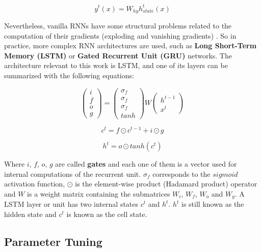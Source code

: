 \begin{equation}
    y^{t}(x) = W_{hy}h_{state}^{t}(x)
\end{equation}

Nevertheless, vanilla RNNs have some structural problems related to the computation of their gradients (exploding and vanishing gradients) \cite{bengio1994learning, pascanu2013difficulty}. So in practice, more complex RNN architectures are used, such as \textbf{Long Short-Term Memory (LSTM)} \cite{hochreiter1997long} or \textbf{Gated Recurrent Unit (GRU)} \cite{cho2014learning} networks. The architecture relevant to this work is LSTM, and one of its layers can be summarized with the following equations:

\begin{equation}
    \begin{pmatrix} i \\ f \\ o \\ g \end{pmatrix} = \begin{pmatrix} \sigma_{f} \\ \sigma_{f} \\ \sigma_{f} \\ tanh \end{pmatrix} W \begin{pmatrix} h^{t-1} \\ x^{t} \end{pmatrix} 
\end{equation}

\begin{equation}
    c^{t} = f \odot c^{t-1} + i \odot g
\end{equation}

\begin{equation}
    h^{t} = o \odot tanh(c^{t})
\end{equation}

Where $i$, $f$, $o$, $g$ are called \textbf{gates} and each one of them is a vector used for internal computations of the recurrent unit. $\sigma_{f}$ corresponds to the $sigmoid$ activation function, $\odot$ is the element-wise product (Hadamard product) operator and $W$ is a weight matrix containing the submatrices $W_{i}$, $W_{f}$, $W_{o}$ and $W_{g}$. A LSTM layer or unit has two internal states $c^{t}$ and $h^{t}$. $h^{t}$ is still known as the hidden state and $c^{t}$ is known as the cell state.

\subsection{Parameter Tuning}

